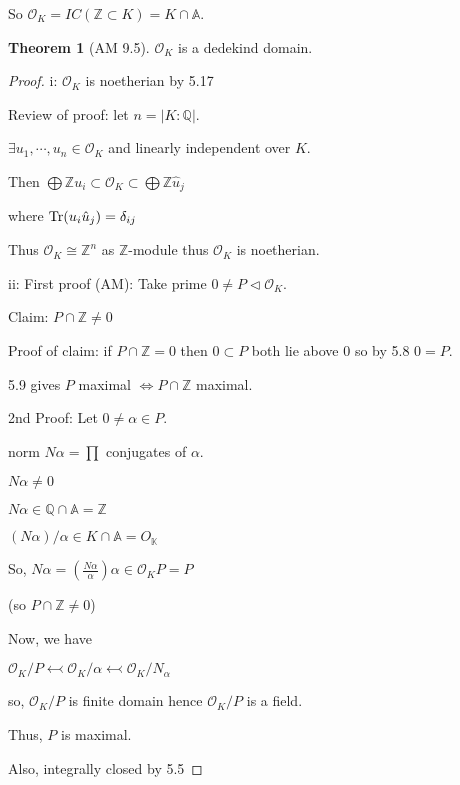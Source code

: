 \documentclass{article}
\theoremstyle{definition}
\newtheorem{theorem}{Theorem}
\begin{document}
So \(\mathcal{O}_K = IC(\mathbb{Z} \subset K)=K\cap\mathbb{A}\).

\begin{theorem}
    [AM 9.5] \(\mathcal{O}_K\) is a dedekind domain. 
\end{theorem}

\begin{proof}
    i: \(\mathcal{O}_K\) is noetherian by 5.17
    
    Review of proof: let \(n = \vert K : \mathbb{Q} \vert \).
    
    \(\exists u_1,\cdots, u_n\in \mathcal{O}_K\) and linearly independent over \(K\).
    
    Then \(\bigoplus \mathbb{Z} u_i \subset \mathcal{O}_K \subset \bigoplus \mathbb{Z} \hat{u}_j\)
    
    where \(\operatorname{Tr}(u_i \hat{u}_j)=\delta_{ij}\)
    
    Thus \(\mathcal{O}_K \cong \mathbb{Z}^n\) as \(\mathbb{Z}\)-module thus \(\mathcal{O}_K\) is noetherian.
    
    ii: First proof (AM): Take prime \(0 \neq P \triangleleft \mathcal{O}_K\).
    
    Claim: \(P\cap\mathbb{Z} \neq 0\)
    
    Proof of claim: if \(P\cap \mathbb{Z} = 0\) then \(0 \subset P\) both lie above \(0\) so by 5.8 \(0 = P\).
    
    5.9 gives \(P\) maximal \(\iff P \cap \mathbb{Z}\) maximal.

    2nd Proof: Let \(0\neq \alpha \in P\).
    
    norm \(N \alpha = \prod\) conjugates of \(\alpha\).
    
    \(N \alpha \neq 0\) 

    \(N \alpha \in \mathbb{Q} \cap \mathbb{A} = \mathbb{Z}\)
    
    \((N \alpha) / \alpha \in K \cap \mathbb{A} = O_\mathbb{K}\) 

    So, \(N \alpha = \left( \frac{N \alpha}{\alpha } \right) \alpha \in \mathcal{O}_K P = P \)
    
    (so \(P\cap\mathbb{Z} \neq 0\))

    Now, we have

    \(\mathcal{O}_K / P \leftarrowtail \mathcal{O}_K / \alpha \leftarrowtail \mathcal{O}_K / N_\alpha\)
    
    so, \(\mathcal{O}_K / P\) is finite domain hence \(\mathcal{O}_K / P\) is a field.
    
    Thus, \(P\) is maximal.

    Also, integrally closed by 5.5

\end{proof}
\end{document}
